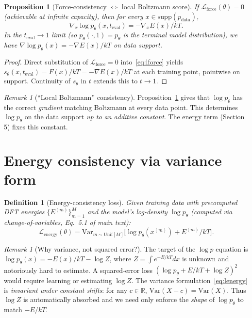 \documentclass[11pt]{article}
\newtheorem{proposition}[theorem]{Proposition}
\newtheorem{definition}[theorem]{Definition}
\theoremstyle{remark}
\newtheorem{remark}[theorem]{Remark}
\theoremstyle{plain}
\newcommand{\R}{\mathbb{R}}
\newcommand{\force}{\mathrm{force}}
\newcommand{\energy}{\mathrm{energy}}
\newcommand{\Var}{\mathrm{Var}}
\begin{document}
\begin{proposition}[Force-consistency $\Leftrightarrow$ local Boltzmann
score]\label{prop:force-equiv}
If $\mathcal{L}_\force(\theta) = 0$ (achievable at infinite capacity),
then for every $x \in \mathrm{supp}(p_\text{data})$,
\[
\nabla_x \log p_\theta(x, t_\mathrm{eval}) = -\nabla_x E(x) / kT.
\]
In the $t_\mathrm{eval} \to 1$ limit (so $p_\theta(\cdot, 1) = p_\theta$
is the terminal model distribution), we have
$\nabla \log p_\theta(x) = -\nabla E(x)/kT$ on data support.
\end{proposition}

\begin{proof}
Direct substitution of $\mathcal{L}_\force = 0$ into~\eqref{eq:lforce}
yields $s_\theta(x, t_\mathrm{eval}) = F(x)/kT = -\nabla E(x)/kT$ at
each training point, pointwise on support. Continuity of $s_\theta$
in $t$ extends this to $t \to 1$.
\end{proof}

\begin{remark}[``Local Boltzmann''
consistency]\label{rmk:local-boltz}
Proposition~\ref{prop:force-equiv} gives that $\log p_\theta$ has
the correct \emph{gradient} matching Boltzmann at every data point.
This determines $\log p_\theta$ on the data support \emph{up to an
additive constant}. The energy term (Section 5) fixes this constant.
\end{remark}

\section{Energy consistency via variance form}

\begin{definition}[Energy-consistency loss]
Given training data with precomputed DFT energies $\{E^{(m)}\}_{m=1}^M$
and the model's log-density $\log p_\theta$ (computed via
change-of-variables, Eq.~5.1 of main text):
\begin{equation}\label{eq:lenergy}
\mathcal{L}_\energy(\theta)
  = \Var_{m \sim \mathrm{Unif}[M]}\!\big[\log p_\theta(x^{(m)}) + E^{(m)}/kT\big].
\end{equation}
\end{definition}

\begin{remark}[Why variance, not squared error?]
The target of the $\log p$ equation is
$\log p_\theta(x) = -E(x)/kT - \log Z$, where $Z = \int e^{-E/kT} dx$
is unknown and notoriously hard to estimate. A squared-error loss
$(\log p_\theta + E/kT + \log Z)^2$ would require learning or
estimating $\log Z$. The variance formulation~\eqref{eq:lenergy} is
\emph{invariant under constant shifts}: for any $c \in \R$, $\Var(X + c)
= \Var(X)$. Thus $\log Z$ is automatically absorbed and we need only
enforce the \emph{shape} of $\log p_\theta$ to match $-E/kT$.
\end{remark}
\end{document}
